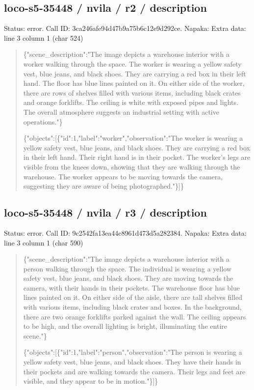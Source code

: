 \documentclass[10pt,a4paper]{article}
\begin{document}
\subsection*{loco-s5-35448 / nvila / r2 / description}
Status: error. Call ID: 3ca246afe94d47b9a75b6c12e9d292ce. Napaka: Extra data: line 3 column 1 (char 524)
\begin{quote}\footnotesize
\{"scene\_description":\allowbreak{}"The image depicts a warehouse interior with a worker walking through the space. The worker is wearing a yellow safety vest,\allowbreak{} blue jeans,\allowbreak{} and black shoes. They are carrying a red box in their left hand. The floor has blue lines painted on it. On either side of the worker,\allowbreak{} there are rows of shelves filled with various items,\allowbreak{} including black crates and orange forklifts. The ceiling is white with exposed pipes and lights. The overall atmosphere suggests an industrial setting with active operations."\}\par
\par
\{"objects":\allowbreak{}[\{"id":\allowbreak{}1,\allowbreak{}"label":\allowbreak{}"wor\allowbreak{}ker",\allowbreak{}"observation":\allowbreak{}"The worker is wearing a yellow safety vest,\allowbreak{} blue jeans,\allowbreak{} and black shoes. They are carrying a red box in their left hand. Their right hand is in their pocket. The worker's legs are visible from the knees down,\allowbreak{} showing that they are walking through the warehouse. The worker appears to be moving towards the camera,\allowbreak{} suggesting they are aware of being photographed."\}]\}
\end{quote}
\subsection*{loco-s5-35448 / nvila / r3 / description}
Status: error. Call ID: 9c2542fa13ea44c8961d473d5a282384. Napaka: Extra data: line 3 column 1 (char 590)
\begin{quote}\footnotesize
\{"scene\_description":\allowbreak{}"The image depicts a warehouse interior with a person walking through the space. The individual is wearing a yellow safety vest,\allowbreak{} blue jeans,\allowbreak{} and black shoes. They are moving towards the camera,\allowbreak{} with their hands in their pockets. The warehouse floor has blue lines painted on it. On either side of the aisle,\allowbreak{} there are tall shelves filled with various items,\allowbreak{} including black crates and boxes. In the background,\allowbreak{} there are two orange forklifts parked against the wall. The ceiling appears to be high,\allowbreak{} and the overall lighting is bright,\allowbreak{} illuminating the entire scene."\}\par
\par
\{"objects":\allowbreak{}[\{"id":\allowbreak{}1,\allowbreak{}"label":\allowbreak{}"per\allowbreak{}son",\allowbreak{}"observation":\allowbreak{}"The person is wearing a yellow safety vest,\allowbreak{} blue jeans,\allowbreak{} and black shoes. They have their hands in their pockets and are walking towards the camera. Their legs and feet are visible,\allowbreak{} and they appear to be in motion."\}]\}
\end{quote}
\end{document}
